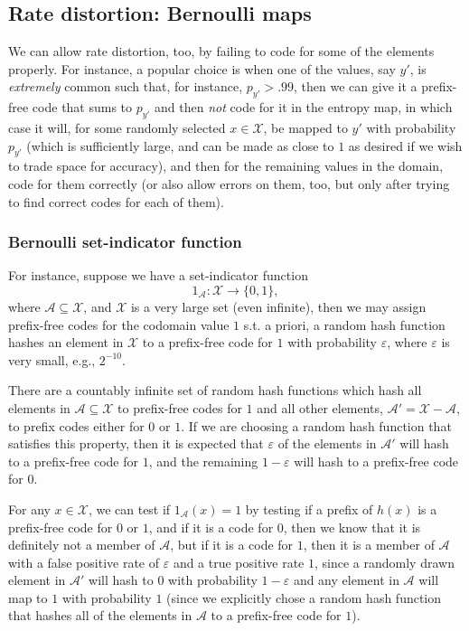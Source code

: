 \documentclass[
]{article}
\begin{document}
\hypertarget{rate-distortion-bernoulli-maps}{%
\subsection{Rate distortion: Bernoulli
maps}\label{rate-distortion-bernoulli-maps}}

We can allow rate distortion, too, by failing to code for some of the
elements properly. For instance, a popular choice is when one of the
values, say \(y'\), is \emph{extremely} common such that, for instance,
\(p_{y'} > .99\), then we can give it a prefix-free code that sums to
\(p_{y'}\) and then \emph{not} code for it in the entropy map, in which
case it will, for some randomly selected \(x \in \mathcal{X}\), be
mapped to \(y'\) with probability \(p_{y'}\) (which is sufficiently
large, and can be made as close to \(1\) as desired if we wish to trade
space for accuracy), and then for the remaining values in the domain,
code for them correctly (or also allow errors on them, too, but only
after trying to find correct codes for each of them).

\hypertarget{bernoulli-set-indicator-function}{%
\subsubsection{Bernoulli set-indicator
function}\label{bernoulli-set-indicator-function}}

For instance, suppose we have a set-indicator function \[
    1_{\mathcal{A}} : \mathcal{X} \to \{0,1\},
\] where \(\mathcal{A} \subseteq \mathcal{X}\), and \(\mathcal{X}\) is a
very large set (even infinite), then we may assign prefix-free codes for
the codomain value \(1\) s.t. a priori, a random hash function hashes an
element in \(\mathcal{X}\) to a prefix-free code for \(1\) with
probability \(\varepsilon\), where \(\varepsilon\) is very small, e.g.,
\(2^{-10}\).

There are a countably infinite set of random hash functions which hash
all elements in \(\mathcal{A} \subseteq \mathcal{X}\) to prefix-free
codes for \(1\) and all other elements,
\(\mathcal{A}' = \mathcal{X} - \mathcal{A}\), to prefix codes either for
\(0\) or \(1\). If we are choosing a random hash function that satisfies
this property, then it is expected that \(\varepsilon\) of the elements
in \(\mathcal{A}'\) will hash to a prefix-free code for \(1\), and the
remaining \(1 - \varepsilon\) will hash to a prefix-free code for \(0\).

For any \(x \in \mathcal{X}\), we can test if \(1_{\mathcal{A}}(x) = 1\)
by testing if a prefix of \(h(x)\) is a prefix-free code for \(0\) or
\(1\), and if it is a code for \(0\), then we know that it is definitely
not a member of \(\mathcal{A}\), but if it is a code for \(1\), then it
is a member of \(\mathcal{A}\) with a false positive rate of
\(\varepsilon\) and a true positive rate \(1\), since a randomly drawn
element in \(\mathcal{A}'\) will hash to \(0\) with probability
\(1 - \varepsilon\) and any element in \(\mathcal{A}\) will map to \(1\)
with probability \(1\) (since we explicitly chose a random hash function
that hashes all of the elements in \(\mathcal{A}\) to a prefix-free code
for \(1\)).
\end{document}
